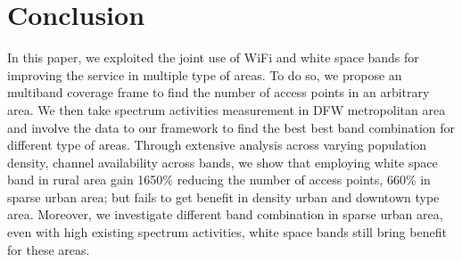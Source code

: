 \section{Conclusion}
\label{sec:conclusion}
In this paper, we exploited the joint use of WiFi and white space bands for 
improving the service in multiple type of areas.  To do so, we
propose an multiband coverage frame to find the number of access points in an arbitrary area.
 We then take spectrum activities measurement in DFW metropolitan area and involve the data to 
 our framework to find the best best band combination for different type of areas. Through 
extensive analysis across varying population density, channel availability across bands, 
we show that employing white space band in rural area gain 1650\% reducing the number of 
access points, 660\% in sparse urban area; but fails to get benefit in density urban and downtown type area.
Moreover, we investigate different band combination in sparse urban area, even with high existing
spectrum activities, white space bands still bring benefit for these areas.


